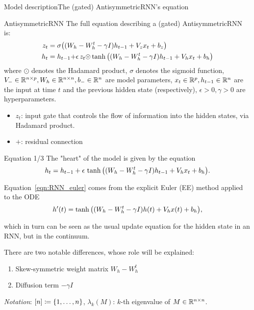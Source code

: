 \documentclass[10pt,xcolor={table,dvipsnames}]{beamer} 		%
\theoremstyle{plain}					%
\theoremstyle{definition}
\theoremstyle{remark}
\begin{document}
	\begin{frame}{Model description}{The (gated) AntisymmetricRNN's equation}
		\begin{block}{AntisymmetricRNN}
			The full equation describing a (gated) AntisymmetricRNN is:
			\[
				\begin{aligned}
					{z_t} &= \sigma\qty((W_h-W_h^t-\gamma I)h_{t-1}+V_z x_t+b_z)\\
					h_t &= h_{t-1}{+}\epsilon\,{z_t\odot}\tanh\qty((W_h-W_h^t-\gamma I)h_{t-1}+V_h x_t+b_h)
				\end{aligned}
			\]
			where $\odot$ denotes the Hadamard product, $\sigma$ denotes the sigmoid function,
			$V_{-}\in\R{n}{p},W_h\in\R{n}{n},b_{-}\in\R{n}$ are model parameters,
			$x_t\in\R{p},h_{t-1}\in\R{n}$ are the input at time $t$ and the previous hidden state (respectively),
			$\epsilon>0,\gamma>0$ are hyperparameters.
		\end{block}
		\begin{itemize}
			\item $z_t$: input gate that controls the flow of information into the hidden states,
				via Hadamard product.
			\item $+$: residual connection 
		\end{itemize}
		
	\end{frame}



	\begin{frame}{Equation 1/3}{}
		The "heart" of the model is given by the equation
		\begin{equation}\label{eqn:RNN_euler}
			h_t = h_{t-1}+\epsilon\,\tanh\qty((W_h-W_h^t-\gamma I)h_{t-1}+V_h x_t+b_h).
		\end{equation}

		Equation~\eqref{eqn:RNN_euler} comes from the explicit Euler (EE) method applied to the ODE
		\begin{equation}\label{eqn:RNN_ODE}
			h'(t)=\tanh\qty((W_h-W_h^t-\gamma I)h(t)+V_h x(t)+b_h),
		\end{equation}
		

		which in turn can be seen as the usual update equation for the hidden state in an RNN,
		but in the continuum.
		\medskip

		There are two notable differences, whose role will be explained:
		\begin{enumerate}
			\item Skew-symmetric weight matrix $W_h-W_h^t$
			\item Diffusion term $-\gamma I$
		\end{enumerate}
		\smallskip

		\emph{Notation}: $[n]\coloneqq\qty{1,\dots,n}$, 
		$\lambda_k(M)$: $k$-th eigenvalue of $M\in\R{n}{n}$.
	\end{frame}
\end{document}
